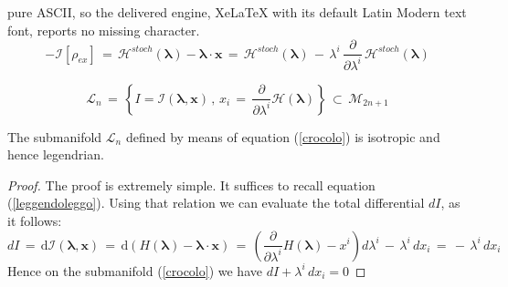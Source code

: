\documentclass[10pt,a4paper]{amsart}
\begin{document}
pure ASCII, so the delivered engine, XeLaTeX with its default Latin Modern text font, reports no missing character.
\begin{equation}
   - \mathcal{I}\left[\rho_{ex}\right]\, = \,
    \mathcal{H}^{stoch}\left(\pmb{\lambda}\right) - \pmb{\lambda}\cdot
    \mathbf{x} \, = \, \mathcal{H}^{stoch}\left(\pmb{\lambda}\right)\, -\,
    \lambda^i \, \frac{\partial}{\partial
    \lambda^i} \,\mathcal{H}^{stoch}\left(\pmb{\lambda}\right)
\label{leggendoleggo}
\end{equation}

\begin{equation}
\label{crocolo}
    \mathcal{L}_n \, = \, \left\{ I =
    \mathcal{I}\left(\pmb{\lambda},\mathbf{x}\right)\, , \, x_i \, = \,
    \frac{\partial}{\partial \lambda^i}
    \mathcal{H}\left(\pmb{\lambda}\right)\right\} \, \subset \,\mathcal{M}_{2n+1}
\end{equation}

\begin{teorema}
\label{gargantua} The submanifold $\mathcal{L}_n$ defined by means of equation
(\ref{crocolo}) is isotropic and hence legendrian.
\end{teorema}

\begin{proof}
The proof is extremely simple. It suffices to recall equation
(\ref{leggendoleggo}). Using that relation we can evaluate the
total differential $dI$, as it follows:
\begin{equation}
dI \, = \,
\mathrm{d}\mathcal{I}\left(\pmb{\lambda},\mathbf{x}\right)\, =
\,\mathrm{d}\left(H(\pmb{\lambda})-\pmb{\lambda}\cdot\mathbf{x}\right)\,
=\, \left(\frac{\partial}{\partial
\lambda^i}H(\pmb{\lambda})-x^i\right)d\lambda^i \, - \, \lambda^i
\,dx_i \, = \, - \, \lambda^i \,dx_i
\end{equation}
Hence on the submanifold (\ref{crocolo}) we have
$dI+\lambda^i \,dx_i=0$
\end{proof}
\end{document}
